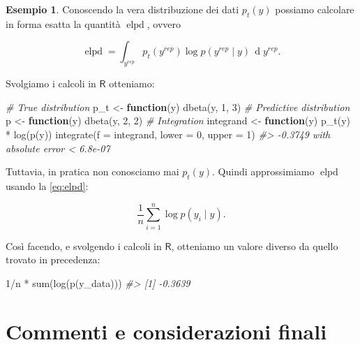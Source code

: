 \documentclass[
  11pt,
]{krantz}
\makeatletter
\newenvironment{Shaded}{\begin{snugshade}}{\end{snugshade}}
\newcommand{\AttributeTok}[1]{\textcolor[rgb]{0.61,0.61,0.61}{#1}}
\newcommand{\CommentTok}[1]{\textcolor[rgb]{0.37,0.37,0.37}{\textit{#1}}}
\newcommand{\ControlFlowTok}[1]{\textcolor[rgb]{0.27,0.27,0.27}{\textbf{#1}}}
\newcommand{\DecValTok}[1]{\textcolor[rgb]{0.06,0.06,0.06}{#1}}
\newcommand{\FunctionTok}[1]{\textcolor[rgb]{0,0,0}{#1}}
\newcommand{\NormalTok}[1]{#1}
\newcommand{\OtherTok}[1]{\textcolor[rgb]{0.37,0.37,0.37}{#1}}
\newcommand{\SpecialCharTok}[1]{\textcolor[rgb]{0,0,0}{#1}}
\newenvironment{kframe}{%
\medskip{}
\setlength{\fboxsep}{.8em}
 \def\at@end@of@kframe{}%
 \ifinner\ifhmode%
  \def\at@end@of@kframe{\end{minipage}}%
  \begin{minipage}{\columnwidth}%
 \fi\fi%
 \def\FrameCommand##1{\hskip\@totalleftmargin \hskip-\fboxsep
 \colorbox{shadecolor}{##1}\hskip-\fboxsep
     \hskip-\linewidth \hskip-\@totalleftmargin \hskip\columnwidth}%
 \MakeFramed {\advance\hsize-\width
   \@totalleftmargin\z@ \linewidth\hsize
   \@setminipage}}%
 {\par\unskip\endMakeFramed%
 \at@end@of@kframe}
\renewenvironment{Shaded}{\begin{kframe}}{\end{kframe}}
\DeclareMathOperator{\elpd}{elpd} %
\newcommand{\R}{\textsf{R}} %
\theoremstyle{definition}
\theoremstyle{definition}
\newtheorem{example}{Esempio}[chapter]
\theoremstyle{definition}
\theoremstyle{definition}
\theoremstyle{remark}
\makeatother
\begin{document}
\begin{example}
Conoscendo la vera distribuzione dei dati \(p_t(y)\) possiamo calcolare in forma esatta la quantità \(\elpd\), ovvero

\[
\elpd = \int_{y^{rep}}p_{t}(y^{rep})\log p(y^{rep} \mid y) \,\operatorname {d}\!y^{rep}.
\]

Svolgiamo i calcoli in \(\R\) otteniamo:

\begin{Shaded}
\begin{Highlighting}[]
\CommentTok{\# True distribution}
\NormalTok{p\_t }\OtherTok{\textless{}{-}} \ControlFlowTok{function}\NormalTok{(y) }\FunctionTok{dbeta}\NormalTok{(y, }\DecValTok{1}\NormalTok{, }\DecValTok{3}\NormalTok{)}
\CommentTok{\# Predictive distribution}
\NormalTok{p }\OtherTok{\textless{}{-}} \ControlFlowTok{function}\NormalTok{(y) }\FunctionTok{dbeta}\NormalTok{(y, }\DecValTok{2}\NormalTok{, }\DecValTok{2}\NormalTok{)}
\CommentTok{\# Integration}
\NormalTok{integrand }\OtherTok{\textless{}{-}} \ControlFlowTok{function}\NormalTok{(y) }\FunctionTok{p\_t}\NormalTok{(y) }\SpecialCharTok{*} \FunctionTok{log}\NormalTok{(}\FunctionTok{p}\NormalTok{(y))}
\FunctionTok{integrate}\NormalTok{(}\AttributeTok{f =}\NormalTok{ integrand, }\AttributeTok{lower =} \DecValTok{0}\NormalTok{, }\AttributeTok{upper =} \DecValTok{1}\NormalTok{)}
\CommentTok{\#\textgreater{} {-}0.3749 with absolute error \textless{} 6.8e{-}07}
\end{Highlighting}
\end{Shaded}

Tuttavia, in pratica non conosciamo mai \(p_t(y)\). Quindi approssimiamo \(\elpd\) usando la \eqref{eq:elpd}:

\[
\frac{1}{n} \sum_{i=1}^n \log p(y_i \mid y).
\]

Così facendo, e svolgendo i calcoli in \(\R\), otteniamo un valore diverso da quello trovato in precedenza:

\begin{Shaded}
\begin{Highlighting}[]
\DecValTok{1}\SpecialCharTok{/}\NormalTok{n }\SpecialCharTok{*} \FunctionTok{sum}\NormalTok{(}\FunctionTok{log}\NormalTok{(}\FunctionTok{p}\NormalTok{(y\_data)))}
\CommentTok{\#\textgreater{} [1] {-}0.3639}
\end{Highlighting}
\end{Shaded}

\end{example}

\hypertarget{commenti-e-considerazioni-finali-1}{%
\section*{Commenti e considerazioni finali}\label{commenti-e-considerazioni-finali-1}}
\end{document}
